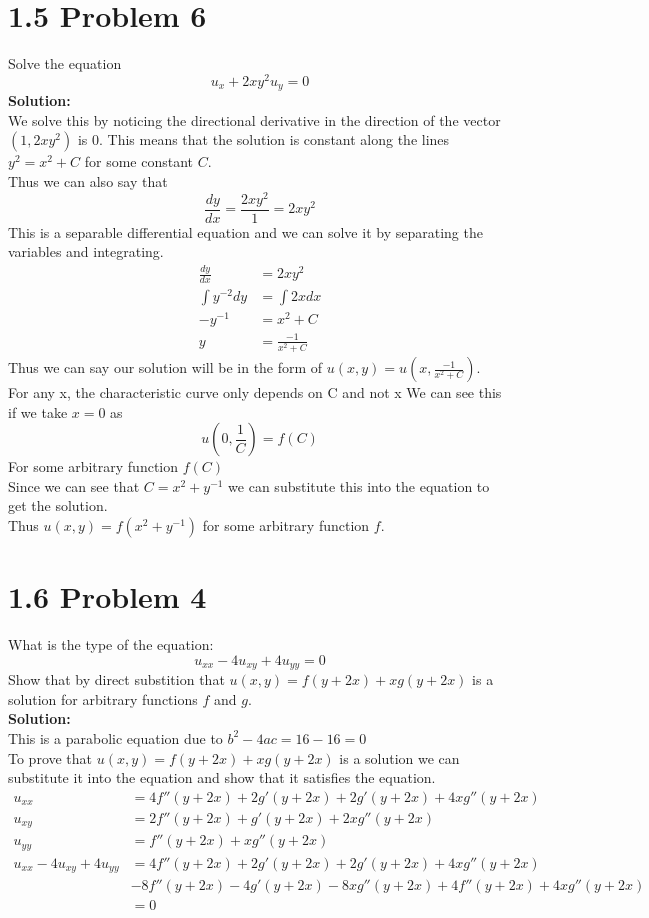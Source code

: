 \documentclass{article}
\begin{document}
\section*{1.5 Problem 6}
Solve the equation 
$$ u_x + 2xy^2 u_y = 0$$
\textbf{Solution: }\\
We solve this by noticing the directional derivative in the direction of the vector $(1, 2xy^2)$ is 0. This means that the solution is constant along the lines $y^2 = x^2 + C$ for some constant $C$.\\
Thus we can also say that 
$$ \frac{dy}{dx} = \frac{2xy^2}{1} = 2xy^2$$
This is a separable differential equation and we can solve it by separating the variables and integrating.\\
\begin{align*}
    \frac{dy}{dx} &= 2xy^2\\
    \int y^{-2} dy &= \int 2x dx\\
    -y^{-1} &= x^2 + C\\
    y &= \frac{-1}{x^2 + C}
\end{align*}
Thus we can say our solution will be in the form of $u(x,y) = u(x, \frac{-1}{x^2 + C})$.\\
For any x, the characteristic curve only depends on C and not x
We can see this if we take $x =0$ as 
$$ u(0, \frac{1}{C}) = f(C)$$ 
For some arbitrary function $f(C)$\\
Since we can see that $C = x^2 + y^{-1}$ we can substitute this into the equation to get the solution.\\
Thus $u(x,y) = f(x^2 + y^{-1})$ for some arbitrary function $f$.


\section*{1.6 Problem 4}
What is the type of the equation:
$$ u_{xx} - 4u_{xy} + 4u_{yy} = 0$$
Show that by direct substition that $u(x,y) = f(y+2x) + xg(y+2x)$ is a solution for arbitrary functions $f$ and $g$. \\
\textbf{Solution:}\\
This is a parabolic equation due to $b^2 - 4ac = 16 - 16 = 0 $ \\
To prove that $u(x,y) = f(y+2x) + xg(y+2x)$ is a solution we can substitute it into the equation and show that it satisfies the equation.\\ 
\begin{align*}
    u_{xx} &= 4f''(y+2x) + 2g'(y+2x) + 2g'(y+2x) + 4xg''(y+2x)\\
    u_{xy} &= 2f''(y+2x) + g'(y+2x) + 2xg''(y+2x)\\
    u_{yy} &= f''(y+2x) + xg''(y+2x)\\
    u_{xx} - 4u_{xy} + 4u_{yy} &= 4f''(y+2x) + 2g'(y+2x) + 2g'(y+2x) + 4xg''(y+2x)\\ &- 8f''(y+2x) - 4g'(y+2x) - 8xg''(y+2x) + 4f''(y+2x) + 4xg''(y+2x)\\
    &= 0
\end{align*}
\end{document}
